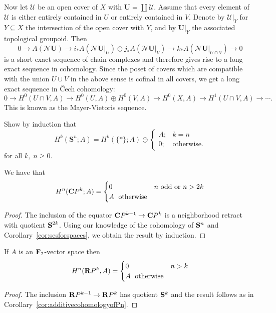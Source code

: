 \documentclass[a4paper,openany]{scrbook}
\newcommand{\nerve}{\mathcal N}
\begin{document}
Now let $\mathcal U$ be an open cover of $X$ with $\mathbf U = \coprod \mathcal U$. Assume that every element of $\mathcal U$ is either entirely contained in $U$ or entirely contained in $V$. Denote by $\mathcal U|_Y$ for $Y \subseteq X$ the intersection of the open cover with $Y$, and by $\mathbf U|_Y$ the associated topological groupoid. Then
\[
0 \to A(\nerve \mathbf U) \to i_*A(\nerve \mathbf U|_U) \oplus j_*A(\nerve \mathbf U|_V) \to k_*A(\nerve \mathbf U|_{U \cap V}) \to 0
\]
is a short exact sequence of chain complexes and therefore gives rise to a long exact sequence in cohomology. Since the poset of covers which are compatible with the union $U \cup V$ in the above sense is cofinal in all covers, we get a long exact sequence in \v Cech cohomology:
\[
0 \to H^0(U \cap V,A) \to H^0(U,A) \oplus H^0(V,A) \to H^0(X,A) \to H^1(U \cap V,A) \to \cdots.
\]
This is known as the Mayer-Vietoris sequence.

\begin{exer}\label{exer:cohomologyofspheres}
Show by induction that 
\[
H^k(\mathbf S^n;A) = H^k(\{*\};A) \oplus \begin{cases} A;& k=n\\ 0;& \text{otherwise.}\end{cases}
\]
for all $k,\;n \geq 0$.
\end{exer}

\begin{corollary}\label{cor:additivecohomologyofPn}
We have that
\[
H^n(\CP^k;A) = \begin{cases} 0\; & n \text{ odd or } n>2k\\ A\; \text{ otherwise}\end{cases}
\]
\end{corollary}
\begin{proof}
The inclusion of the equator $\CP^{k-1} \to \CP^k$ is a neighborhood retract with quotient $\S^{2k}$. Using our knowledge of the cohomology of $\S^n$ and Corollary~\ref{cor:sesforspaces}, we obtain the result by induction.
\end{proof}

\begin{corollary}\label{cor:additivecohomologyofRPn}
If $A$ is an $\F_2$-vector space then
\[
H^n(\R P^k,A) = \begin{cases} 0\; & n > k\\ A\; \text{ otherwise}\end{cases}
\]
\end{corollary}
\begin{proof}
The inclusion $\R P^{k-1} \to \R P^k$ has quotient $\S^k$ and the result follows as in Corollary~\ref{cor:additivecohomologyofPn}. 
\end{proof}
\end{document}
